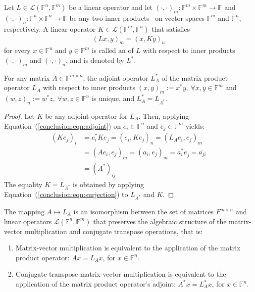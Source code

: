 \begin{definition}
Let $L \in \mathcal{L}(\mathbb{F}^n, \mathbb{F}^m)$ be a linear operator and
let $(\cdot, \cdot)_m : \mathbb{F}^m \times \mathbb{F}^m \rightarrow
\mathbb{F}$ and $(\cdot, \cdot)_n : \mathbb{F}^n \times \mathbb{F}^n
\rightarrow \mathbb{F}$ be any two inner products~\cite{la} on vector spaces
$\mathbb{F}^m$ and $\mathbb{F}^n$, respectively. A linear operator $K \in
\mathcal{L}(\mathbb{F}^m, \mathbb{F}^n)$ that satisfies
\begin{align}
    (Lx, y)_m = (x, Ky)_n \label{conclusion:eqn:adjoint}
\end{align}
for every $x \in \mathbb{F}^n$ and $y \in \mathbb{F}^m$ is called an
 of $L$ with respect to inner products $(\cdot,
\cdot)_m$ and $(\cdot, \cdot)_n$, and is denoted by $L^*$.
\end{definition}

\begin{theorem}
\label{conclusion:thm:adjoint}
For any matrix $A \in \mathbb{F}^{m \times n}$, the adjoint operator $L_A^*$ of
the matrix product operator $L_A$ with respect to inner products $(x, y)_m :=
x^*y, \ \forall x,y \in \mathbb{F}^m$ and $(w, z)_n := w^*z, \ \forall w, z \in
\mathbb{F}^n$ is unique, and $L_A^* = L_{A^*}^{}$.
\end{theorem}

\begin{proof}
Let $K$ be any adjoint operator for $L_A$. Then, applying
Equation~(\ref{conclusion:eqn:adjoint}) on $e_i \in \mathbb{F}^n$ and $e_j \in
\mathbb{F}^m$ yields:
\begin{align}
    (Ke_j)_i &= e_i^*Ke_j^{} = (e_i, Ke_j)_n = (L_Ae_i, e_j)_m \nonumber \\
             &= (Ae_i,  e_j)_m = (a_i, e_j)_m =a_i^*e_j^{} = \overline{a_{ji}}
             \\
             &= (A^*)_{ij} \nonumber
\end{align}
The equality $K = L_{A^*}$ is obtained by applying
Equation~(\ref{conclusion:eqn:surjection}) to $L_{A^*}$ and $K$.
\end{proof}

\begin{corollary}
\label{conclusion:cor:matrix-linop}
The mapping $A \mapsto L_A$ is an isomorphism between the set of
matrices $F^{m \times n}$ and linear operators $\mathcal{L}(\mathbb{F}^n,
\mathbb{F}^m)$ that preserves the algebraic structure of the matrix-vector
multiplication and conjugate transpose operations, that is:
\begin{enumerate}
\item Matrix-vector multiplication is equivalent to the application of the
matrix product operator: $Ax = L_Ax$, for $x \in \mathbb{F}^n$.
\item Conjugate transpose matrix-vector multiplication is equivalent to the
application of the matrix product operator's adjoint: $A^*x = L_A^*x$, for $x
\in \mathbb{F}^n$.
\end{enumerate}
\end{corollary}

